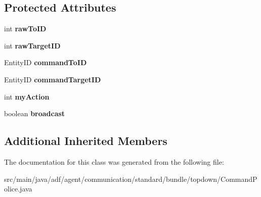 \subsection*{Protected Attributes}
\begin{DoxyCompactItemize}
\item 
\hypertarget{classadf_1_1agent_1_1communication_1_1standard_1_1bundle_1_1topdown_1_1CommandPolice_aa780239e05d4eee72bba2f010e0cf37f}{}\label{classadf_1_1agent_1_1communication_1_1standard_1_1bundle_1_1topdown_1_1CommandPolice_aa780239e05d4eee72bba2f010e0cf37f} 
int {\bfseries raw\+To\+ID}
\item 
\hypertarget{classadf_1_1agent_1_1communication_1_1standard_1_1bundle_1_1topdown_1_1CommandPolice_ab4e2a31bc7ac624425ae083eb4510a3f}{}\label{classadf_1_1agent_1_1communication_1_1standard_1_1bundle_1_1topdown_1_1CommandPolice_ab4e2a31bc7ac624425ae083eb4510a3f} 
int {\bfseries raw\+Target\+ID}
\item 
\hypertarget{classadf_1_1agent_1_1communication_1_1standard_1_1bundle_1_1topdown_1_1CommandPolice_af555844ae2ce52d127f2b83304b012a0}{}\label{classadf_1_1agent_1_1communication_1_1standard_1_1bundle_1_1topdown_1_1CommandPolice_af555844ae2ce52d127f2b83304b012a0} 
Entity\+ID {\bfseries command\+To\+ID}
\item 
\hypertarget{classadf_1_1agent_1_1communication_1_1standard_1_1bundle_1_1topdown_1_1CommandPolice_a17f5e43f5dd4772899e4bd26977932a9}{}\label{classadf_1_1agent_1_1communication_1_1standard_1_1bundle_1_1topdown_1_1CommandPolice_a17f5e43f5dd4772899e4bd26977932a9} 
Entity\+ID {\bfseries command\+Target\+ID}
\item 
\hypertarget{classadf_1_1agent_1_1communication_1_1standard_1_1bundle_1_1topdown_1_1CommandPolice_a1226fb13b11a2b7164e265d76d48cabf}{}\label{classadf_1_1agent_1_1communication_1_1standard_1_1bundle_1_1topdown_1_1CommandPolice_a1226fb13b11a2b7164e265d76d48cabf} 
int {\bfseries my\+Action}
\item 
\hypertarget{classadf_1_1agent_1_1communication_1_1standard_1_1bundle_1_1topdown_1_1CommandPolice_a15e8dd86eff2eb8035edf18910d387c6}{}\label{classadf_1_1agent_1_1communication_1_1standard_1_1bundle_1_1topdown_1_1CommandPolice_a15e8dd86eff2eb8035edf18910d387c6} 
boolean {\bfseries broadcast}
\end{DoxyCompactItemize}
\subsection*{Additional Inherited Members}


The documentation for this class was generated from the following file\+:\begin{DoxyCompactItemize}
\item 
src/main/java/adf/agent/communication/standard/bundle/topdown/Command\+Police.\+java\end{DoxyCompactItemize}
